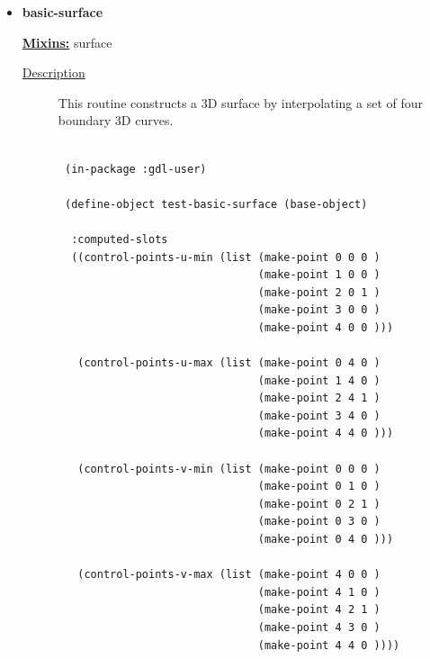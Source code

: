 \documentclass [11pt]{book}
\begin{document}
\begin{itemize}
\item {}
\label{prim:basic-surface}
\textbf{basic-surface}


\textbf{
\underline{Mixins:}} surface





\begin{description}

\item [
\underline{Description}]


This routine constructs a 3D surface by interpolating
   a set of four boundary 3D curves.



\end{description}




\begin{figure}
\begin{lrbox}{\boxedverb}
\begin{minipage}{\linewidth}
{\small

\begin{verbatim}
 
 (in-package :gdl-user)   

 (define-object test-basic-surface (base-object)
  
  :computed-slots
  ((control-points-u-min (list (make-point 0 0 0 )
                               (make-point 1 0 0 )
                               (make-point 2 0 1 )
                               (make-point 3 0 0 )
                               (make-point 4 0 0 )))
   
   (control-points-u-max (list (make-point 0 4 0 )
                               (make-point 1 4 0 )
                               (make-point 2 4 1 )
                               (make-point 3 4 0 )
                               (make-point 4 4 0 )))
   
   (control-points-v-min (list (make-point 0 0 0 )
                               (make-point 0 1 0 )
                               (make-point 0 2 1 )
                               (make-point 0 3 0 )
                               (make-point 0 4 0 )))
                              
   (control-points-v-max (list (make-point 4 0 0 )
                               (make-point 4 1 0 )
                               (make-point 4 2 1 )
                               (make-point 4 3 0 )
                               (make-point 4 4 0 ))))
  

\end{verbatim}}
\end{minipage}
\end{lrbox}
\end{figure}
\end{itemize}
\end{document}
